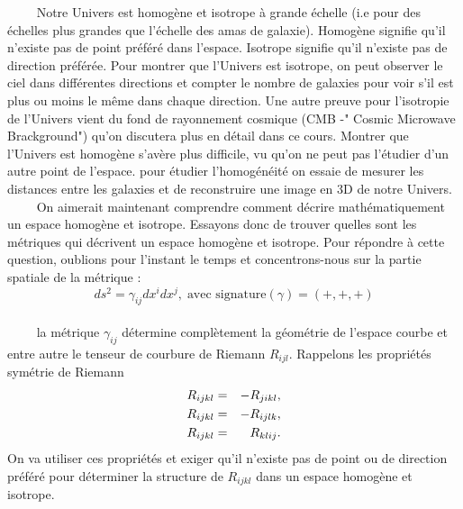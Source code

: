 \documentclass[a4paper,12pt]{report}
\theoremstyle{plain}
\theoremstyle{plain}
\begin{document}
 $\qquad$ Notre Univers est homog\`ene et isotrope \`a grande \'echelle (i.e pour des \'echelles plus grandes que l'\'echelle des amas de galaxie). Homog\`ene signifie qu'il n'existe pas de point pr\'ef\'er\'e dans l'espace. Isotrope signifie qu'il n'existe pas de direction pr\'ef\'er\'ee. Pour montrer que l'Univers est isotrope, on peut observer le ciel dans diff\'erentes directions et compter le nombre de galaxies pour voir s'il est plus ou moins le m\^eme dans chaque direction. Une autre preuve pour l'isotropie de l'Univers vient du fond de rayonnement cosmique (CMB -" Cosmic Microwave Brackground") qu'on discutera plus en d\'etail dans ce cours. Montrer que l'Univers est homog\`ene s'av\`ere plus difficile, vu qu'on ne peut pas l'\'etudier d'un autre point de l'espace. pour \'etudier l'homog\'en\'eit\'e on essaie de mesurer les distances entre les galaxies et de reconstruire une image en 3D de notre Univers. \\
 
 $\qquad$ On aimerait maintenant comprendre comment d\'ecrire math\'ematiquement un espace homog\`ene et isotrope. Essayons donc de trouver quelles sont les m\'etriques qui d\'ecrivent un espace homog\`ene et isotrope. Pour r\'epondre \`a cette question, oublions pour l'instant le temps et concentrons-nous sur la partie spatiale de la m\'etrique :
 \begin{equation*}
 ds^2=\gamma_{ij}dx^idx^j, \;  \text{avec signature}\left(\gamma \right) =\left(+,+,+ \right) 
 \end{equation*} \\
 
 $\qquad$ la m\'etrique $\gamma_{ij}$ d\'etermine compl\`etement la g\'eom\'etrie de l'espace courbe et entre autre le tenseur de courbure de Riemann $R_{ijl}$. Rappelons les propri\'et\'es sym\'etrie de Riemann 
 \begin{eqnarray}
  R_{ijkl} &=& -R_{jikl}, \cr 
  R_{ijkl} &=& -R_{ijlk},\cr
  R_{ijkl} &=& R_{klij}.
 \end{eqnarray} 
 On va utiliser ces propri\'et\'es et exiger qu'il n'existe pas de point ou de direction pr\'ef\'er\'e pour d\'eterminer la structure de $R_{ijkl}$ dans un espace homog\`ene et isotrope.\\
 
\end{document}
